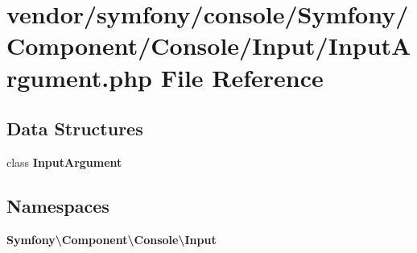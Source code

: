 \section{vendor/symfony/console/\+Symfony/\+Component/\+Console/\+Input/\+Input\+Argument.php File Reference}
\label{_input_argument_8php}
\subsection*{Data Structures}
\begin{DoxyCompactItemize}
\item 
class {\bf Input\+Argument}
\end{DoxyCompactItemize}
\subsection*{Namespaces}
\begin{DoxyCompactItemize}
\item 
 {\bf Symfony\textbackslash{}\+Component\textbackslash{}\+Console\textbackslash{}\+Input}
\end{DoxyCompactItemize}
